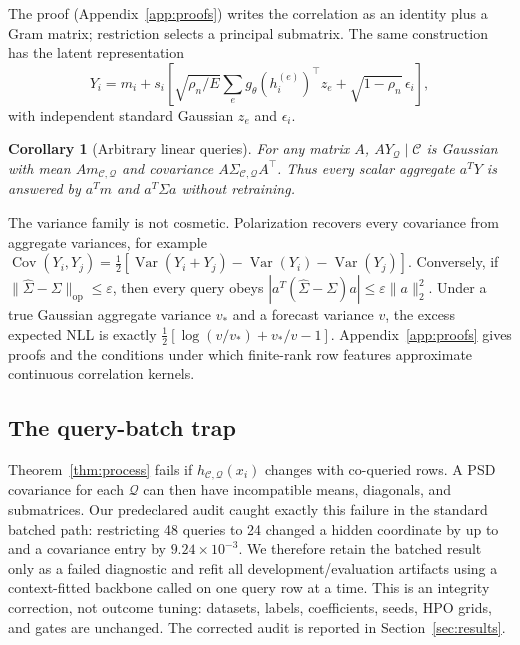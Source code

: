 \documentclass{article}
\newtheorem{corollary}{Corollary}
\newcommand{\context}{\mathcal{C}}
\newcommand{\query}{\mathcal{Q}}
\begin{document}
The proof (Appendix~\ref{app:proofs}) writes the correlation as an identity
plus a Gram matrix; restriction selects a principal submatrix.  The same
construction has the latent representation
\begin{equation}
Y_i=m_i+s_i\!\left[\sqrt{\rho_n/E}\sum_e
g_\theta(h_i^{(e)})^\top z_e+\sqrt{1-\rho_n}\,\epsilon_i\right],
\end{equation}
with independent standard Gaussian $z_e$ and $\epsilon_i$.

\begin{corollary}[Arbitrary linear queries]\label{cor:linear}
For any matrix $A$, $AY_\query\mid\context$ is Gaussian with mean
$Am_{\context,\query}$ and covariance
$A\Sigma_{\context,\query}A^\top$.  Thus every scalar aggregate $a^TY$ is
answered by $a^Tm$ and $a^T\Sigma a$ without retraining.
\end{corollary}

The variance family is not cosmetic.  Polarization recovers every covariance
from aggregate variances, for example
$\operatorname{Cov}(Y_i,Y_j)=\tfrac12[\operatorname{Var}(Y_i+Y_j)
-\operatorname{Var}(Y_i)-\operatorname{Var}(Y_j)]$.  Conversely, if
$\|\widehat\Sigma-\Sigma\|_{\mathrm{op}}\leq\varepsilon$, then every query
obeys
$|a^T(\widehat\Sigma-\Sigma)a|\leq\varepsilon\|a\|_2^2$.
Under a true Gaussian aggregate variance $v_*$ and a forecast variance $v$,
the excess expected NLL is exactly
$\frac12[\log(v/v_*)+v_*/v-1]$.  Appendix~\ref{app:proofs} gives proofs and
the conditions under which finite-rank row features approximate continuous
correlation kernels.

\subsection{The query-batch trap}

Theorem~\ref{thm:process} fails if $h_{\context,\query}(x_i)$ changes with
co-queried rows.  A PSD covariance for each $\query$ can then have incompatible
means, diagonals, and submatrices.  Our predeclared audit caught exactly this
failure in the standard batched path: restricting 48 queries to 24 changed a
hidden coordinate by up to \BatchedAuditMax{} and a covariance entry by
$9.24\times10^{-3}$.  We therefore retain the batched result only as a failed
diagnostic and refit all development/evaluation artifacts using a context-fitted
backbone called on one query row at a time.  This is an integrity correction,
not outcome tuning: datasets, labels, coefficients, seeds, HPO grids, and gates
are unchanged.  The corrected audit is reported in Section~\ref{sec:results}.
\end{document}
